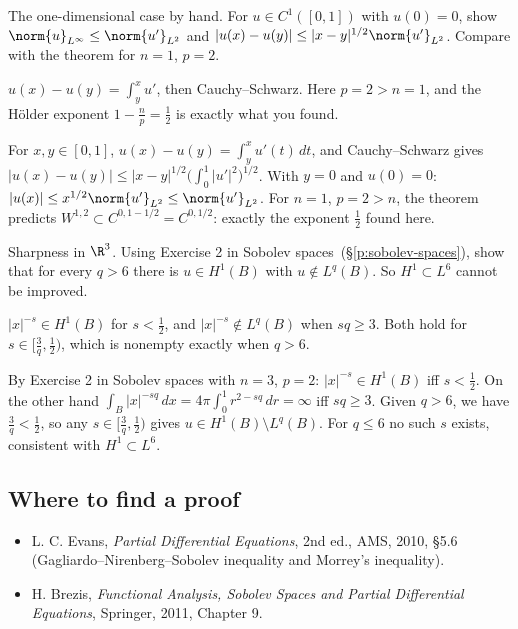 \begin{exercise}
  The one-dimensional case by hand. For $u \in C^1([0,1])$ with $u(0) = 0$, show $\norm{u}_{L^\infty} \le \norm{u'}_{L^2}$ and $|u(x) - u(y)| \le |x-y|^{1/2}\norm{u'}_{L^2}$. Compare with the theorem for $n = 1$, $p = 2$.
  \begin{hint}
    $u(x) - u(y) = \int_y^x u'$, then Cauchy--Schwarz. Here $p = 2 > n = 1$, and the Hölder exponent $1 - \frac{n}{p} = \frac12$ is exactly what you found.
  \end{hint}
  \begin{solution}
    For $x, y \in [0,1]$, $u(x) - u(y) = \int_y^x u'(t)\,dt$, and Cauchy--Schwarz gives $|u(x) - u(y)| \le |x - y|^{1/2}\big(\int_0^1|u'|^2\big)^{1/2}$. With $y = 0$ and $u(0) = 0$: $|u(x)| \le x^{1/2}\norm{u'}_{L^2} \le \norm{u'}_{L^2}$. For $n = 1$, $p = 2 > n$, the theorem predicts $W^{1,2} \subset C^{0,1-1/2} = C^{0,1/2}$: exactly the exponent $\frac12$ found here.
  \end{solution}
\end{exercise}

\begin{exercise}
  Sharpness in $\R^3$. Using Exercise 2 in Sobolev spaces~(\S\ref{p:sobolev-spaces}), show that for every $q > 6$ there is $u \in H^1(B)$ with $u \notin L^q(B)$. So $H^1 \subset L^6$ cannot be improved.
  \begin{hint}
    $|x|^{-s} \in H^1(B)$ for $s < \frac12$, and $|x|^{-s} \notin L^q(B)$ when $sq \ge 3$. Both hold for $s \in [\frac3q, \frac12)$, which is nonempty exactly when $q > 6$.
  \end{hint}
  \begin{solution}
    By Exercise 2 in Sobolev spaces with $n = 3$, $p = 2$: $|x|^{-s} \in H^1(B)$ iff $s < \frac12$. On the other hand $\int_B|x|^{-sq}\,dx = 4\pi\int_0^1 r^{2-sq}\,dr = \infty$ iff $sq \ge 3$. Given $q > 6$, we have $\frac3q < \frac12$, so any $s \in [\frac3q, \frac12)$ gives $u \in H^1(B)\setminus L^q(B)$. For $q \le 6$ no such $s$ exists, consistent with $H^1 \subset L^6$.
  \end{solution}
\end{exercise}

\subsection*{Where to find a proof}

\begin{itemize}
\item L. C. Evans, \emph{Partial Differential Equations}, 2nd ed., AMS, 2010, §5.6 (Gagliardo--Nirenberg--Sobolev inequality and Morrey's inequality).
\item H. Brezis, \emph{Functional Analysis, Sobolev Spaces and Partial Differential Equations}, Springer, 2011, Chapter 9.
\end{itemize}

